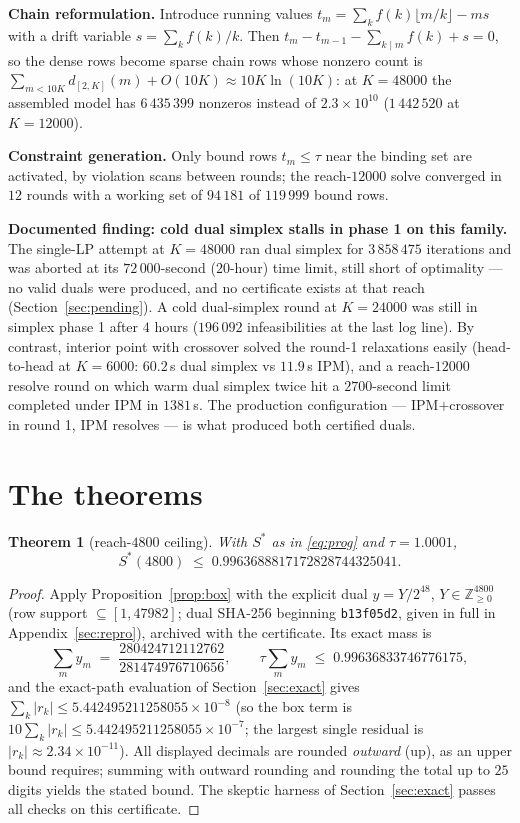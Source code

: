 \documentclass[11pt]{article}
\newtheorem{theorem}{Theorem}
\theoremstyle{remark}
\newcommand{\ZZ}{\mathbb{Z}}
\newcommand{\Sstar}{S^{*}}
\begin{document}
\textbf{Chain reformulation.} Introduce running values
$t_m = \sum_k f(k)\lfloor m/k \rfloor - m s$ with a drift variable
$s = \sum_k f(k)/k$. Then $t_m - t_{m-1} - \sum_{k \mid m} f(k) + s = 0$,
so the dense rows become sparse chain rows whose nonzero count is
$\sum_{m < 10K} d_{[2,K]}(m) + O(10K) \approx 10K \ln(10K)$: at
$K = 48000$ the assembled model has $6\,435\,399$ nonzeros instead of
$2.3\times10^{10}$ ($1\,442\,520$ at $K = 12000$).

\textbf{Constraint generation.} Only bound rows $t_m \le \tau$ near the
binding set are activated, by violation scans between rounds; the
reach-$12000$ solve converged in $12$ rounds with a working set of
$94\,181$ of $119\,999$ bound rows.

\textbf{Documented finding: cold dual simplex stalls in phase 1 on this
family.} The single-LP attempt at $K = 48000$ ran dual simplex for
$3\,858\,475$ iterations and was aborted at its $72\,000$-second
($20$-hour) time limit, still short of optimality --- no valid duals were
produced, and no certificate exists at that reach
(Section~\ref{sec:pending}). A cold dual-simplex round at $K = 24000$ was
still in simplex phase 1 after $4$ hours ($196\,092$ infeasibilities at
the last log line). By contrast, interior point with crossover solved the
round-1 relaxations easily (head-to-head at $K = 6000$: $60.2$\,s dual
simplex vs $11.9$\,s IPM), and a reach-$12000$ resolve round on which warm
dual simplex twice hit a $2700$-second limit completed under IPM in
$1381$\,s. The production configuration --- IPM$+$crossover in round 1,
IPM resolves --- is what produced both certified duals.

\section{The theorems}\label{sec:theorems}

\begin{theorem}[reach-$4800$ ceiling]\label{thm:k4800}
With $\Sstar$ as in \eqref{eq:prog} and $\tau = 1.0001$,
\[
\Sstar(4800) \;\le\; 0.9963688817172828744325041 .
\]
\end{theorem}

\begin{proof}
Apply Proposition~\ref{prop:box} with the explicit dual
$y = Y/2^{48}$, $Y \in \ZZ_{\ge0}^{4800}$ (row support
$\subseteq [1, 47982]$; dual SHA-256 beginning \texttt{b13f05d2}, given in
full in Appendix~\ref{sec:repro}), archived with the certificate. Its
exact mass is
\[
\sum_m y_m \;=\; \frac{280424712112762}{281474976710656},
\qquad
\tau \sum_m y_m \;\le\; 0.99636833746776175,
\]
and the exact-path evaluation of Section~\ref{sec:exact} gives
$\sum_k |r_k| \le 5.442495211258055\times10^{-8}$ (so the box term is
$10\sum_k|r_k| \le 5.442495211258055\times10^{-7}$; the largest single
residual is $|r_k| \approx 2.34\times10^{-11}$). All displayed decimals are
rounded \emph{outward} (up), as an upper bound requires; summing with
outward rounding and rounding the total up to $25$ digits yields the stated
bound.
The skeptic harness of Section~\ref{sec:exact} passes all checks on this
certificate.
\end{proof}
\end{document}
